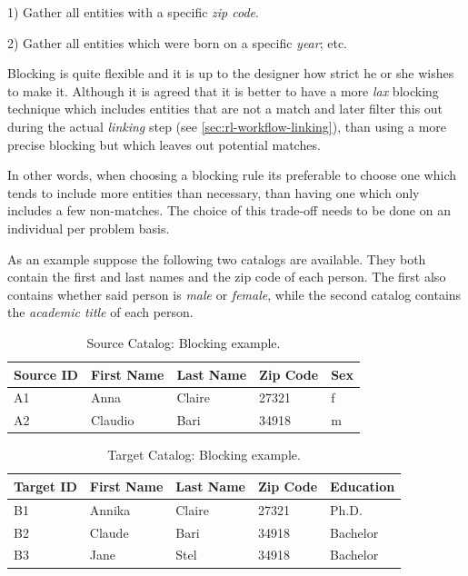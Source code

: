\documentclass[epsfig,a4paper,11pt,titlepage,twoside,openany]{book}
\begin{document}
1) Gather all entities with a specific \textit{zip code}. 

2) Gather all entities which were born on a specific \textit{year}; etc.

Blocking is quite flexible and it is up to the designer how strict he or she wishes to make it.
Although it is agreed
\cite{christen12_survey_index_techn_scalab_recor_linkag_dedup} that it is better
to have a more \textit{lax} blocking technique which includes entities that are
not a match and later filter this out during the actual \textit{linking} step
(see \autoref{sec:rl-workflow-linking}), than using a more precise blocking but
which leaves out potential matches. 

In other words, when choosing a blocking rule its preferable to choose one which tends to include more entities than necessary, than having one which only includes a few non-matches. The choice of this trade-off needs to be done on an individual per problem basis.

As an example suppose the following two catalogs are available. They both contain the
first and last names and the zip code of each person. The first also contains
whether said person is \textit{male} or \textit{female}, while the second catalog
contains the \textit{academic title} of each person.


\begin{table}[H]
  \centering
  \begin{tabular}{l|l|l|l|l}
    Source ID & First Name & Last Name & Zip Code & Sex \\ \hline
    A1        & Anna       & Claire    & 27321    & f   \\
    A2        & Claudio    & Bari      & 34918    & m  
  \end{tabular}
  \caption{Source Catalog: Blocking example.}
  \label{tab:blocking-ex-source}
\end{table}

\begin{table}[H]
  \centering
  \begin{tabular}{l|l|l|l|l}
    Target ID & First Name & Last Name & Zip Code & Education \\ \hline
    B1        & Annika     & Claire    & 27321    & Ph.D.     \\
    B2        & Claude     & Bari      & 34918    & Bachelor  \\
    B3        & Jane       & Stel      & 34918    & Bachelor 
  \end{tabular}
  \caption{Target Catalog: Blocking example.}
  \label{tab:blocking-ex-target}
\end{table}
\end{document}
